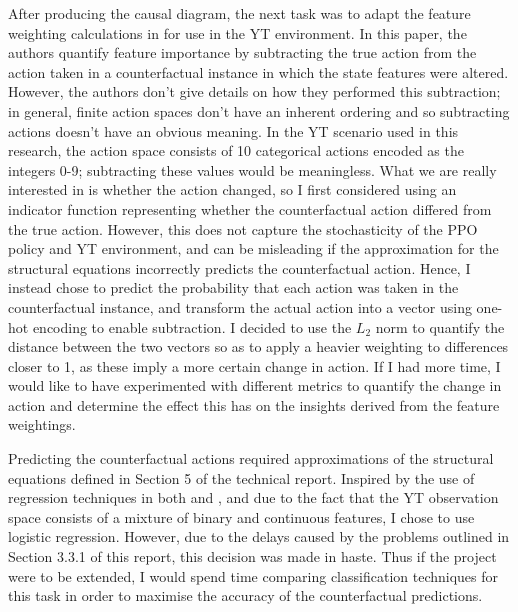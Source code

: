 \documentclass{article}
\begin{document}
After producing the causal diagram, the next task was to adapt the feature weighting calculations in \cite{wang2022causal} for use in the YT environment. In this paper, the authors quantify feature importance by subtracting the true action from the action taken in a counterfactual instance in which the state features were altered. However, the authors don't give details on how they performed this subtraction; in general, finite action spaces don't have an inherent ordering and so subtracting actions doesn't have an obvious meaning. In the YT scenario used in this research, the action space consists of 10 categorical actions encoded as the integers 0-9; subtracting these values would be meaningless. What we are really interested in is whether the action changed, so I first considered using an indicator function representing whether the counterfactual action differed from the true action. However, this does not capture the stochasticity of the PPO policy and YT environment, and can be misleading if the approximation for the structural equations incorrectly predicts the counterfactual action. Hence, I instead chose to predict the probability that each action was taken in the counterfactual instance, and transform the actual action into a vector using one-hot encoding to enable subtraction. I decided to use the $L_2$ norm to quantify the distance between the two vectors so as to apply a heavier weighting to differences closer to 1, as these imply a more certain change in action. If I had more time, I would like to have experimented with different metrics to quantify the change in action and determine the effect this has on the insights derived from the feature weightings.

Predicting the counterfactual actions required  approximations of the structural equations defined in Section 5 of the technical report. Inspired by the use of regression techniques in both \cite{madumal2020explainable} and \cite{wang2022causal}, and due to the fact that the YT observation space consists of a mixture of binary and continuous features, I chose to use logistic regression. However, due to the delays caused by the problems outlined in Section 3.3.1 of this report, this decision was made in haste. Thus if the project were to be extended, I would spend time comparing classification techniques for this task in order to maximise the accuracy of the counterfactual predictions. 
\end{document}
